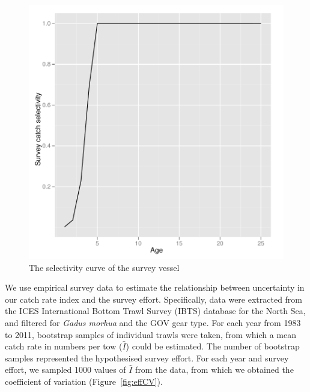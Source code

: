 \documentclass[a4paper]{article}
\begin{document}
\begin{figure}
\centering
\includegraphics{script-survey_sel_plot}
\caption{The selectivity curve of the survey vessel}
\label{fig:survey_sel}
\end{figure}

We use empirical survey data to estimate the relationship between uncertainty in our catch rate index and the survey effort. Specifically, data
were extracted from the ICES International Bottom Trawl Survey (IBTS) database for the North Sea, and filtered for \textit{Gadus morhua} and the GOV gear type.
For each year from 1983 to 2011, bootstrap samples of individual trawls were taken, from which a mean catch rate in numbers per tow ($\hat{I}$) could
be estimated. The number of bootstrap samples represented the hypothesised survey effort. For each year and survey effort, we sampled 1000 values of $\hat{I}$
from the data, from which we obtained the coefficient of variation (Figure~\ref{fig:effCV}).
\end{document}
